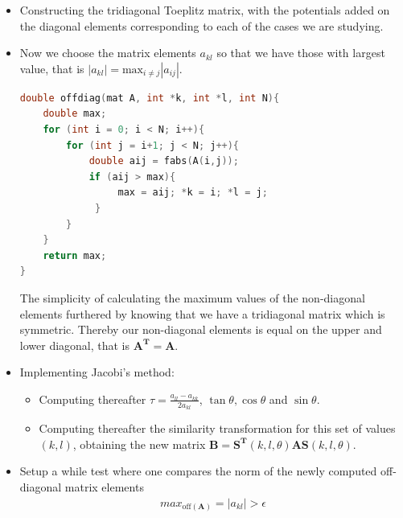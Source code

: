 \documentclass[twoside,onecolumn]{article}
\begin{document}
\begin{itemize}
\item Constructing the tridiagonal Toeplitz matrix, with the potentials added on the diagonal elements corresponding to each of the cases we are studying. \\ 


\item Now we choose the matrix elements $a_{kl}$ so that we have those with largest value, that is $|a_{kl}|= \text{max}_{i\neq j}|a_{ij}|$.

\bigskip

\bigskip

\begin{lstlisting}[language=C++, caption = C++ Finding Maximum value of non-diagonal elements, style=customc]
double offdiag(mat A, int *k, int *l, int N){
    double max;
    for (int i = 0; i < N; i++){
        for (int j = i+1; j < N; j++){
            double aij = fabs(A(i,j));
            if (aij > max){
                 max = aij; *k = i; *l = j;
             }
        }
    }
    return max;
}
\end{lstlisting}

\bigskip

The simplicity of calculating the maximum values of the non-diagonal elements furthered by knowing that we have a tridiagonal matrix which is symmetric. Thereby our non-diagonal elements is equal on the upper and lower diagonal, that is $\mathbf{A^T} =\mathbf{A}$.

\bigskip

\item Implementing Jacobi's method:
\begin{itemize}

\item Computing thereafter $\tau = \frac{a_{ll} - a_{kk}}{2a_{kl}}$, $\tan\theta, \cos{\theta}$ and $\sin{\theta}$. \\

\item Computing thereafter the similarity transformation for this set of values $(k,l)$, obtaining the new matrix $\mathbf{B} = \mathbf{S^T}(k,l,\theta) \mathbf{A} \mathbf{S}(k,l,\theta)$. \\

\end{itemize}

\bigskip

\item Setup a while test where one compares the norm of the newly computed off-diagonal matrix elements 
\begin{align*}
max_{\text{off}(\bm{A})} = |a_{kl}|> \epsilon
\end{align*}




\end{itemize}
\end{document}
